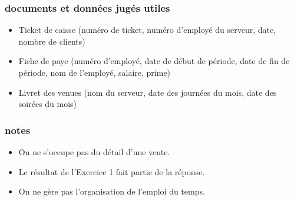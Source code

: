 \subsubsection*{documents et données jugés utiles}
\begin{itemize}
    \item Ticket de caisse (numéro de ticket, numéro d'employé du serveur, date, nombre de clients)
    \item Fiche de paye (numéro d'employé, date de début de période, date de fin de période, nom de l'employé, salaire, prime)
    \item Livret des venues (nom du serveur, date des journées du mois, date des soirées du mois)
\end{itemize}

\subsubsection*{notes}
\begin{itemize}
    \item On ne s'occupe pas du détail d'une vente.
    \item Le résultat de l'Exercice 1 fait partie de la réponse.
    \item On ne gère pas l'organisation de l'emploi du temps.
\end{itemize}
